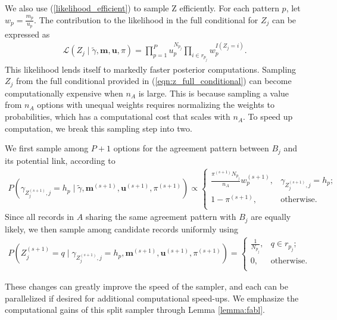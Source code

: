 \documentclass[ba]{imsart}
\begin{document}
We also use (\ref{likelihood_efficient}) to sample Z efficiently. For each pattern $p$, let $w_p =\frac{m_p}{u_p}$.  The contribution to the likelihood in the full conditional for $Z_j$ can be expressed as
\begin{align}
	\mathcal{L}(Z_j\mid  \tilde{\gamma}, \bm{m}, \bm{u}, \pi) = \prod_{p=1}^P u_p^{N_{p_j}} \prod_{i \in r_{p_j}} w_p^{I(Z_j = i)}. \label{likelihood_efficient_z}
\end{align}
This likelihood lends itself to markedly faster posterior computations. Sampling $Z_j$ from the full conditional provided in (\ref{eqn:z_full_conditional}) can become computationally expensive when $n_A$ is large. This is because sampling a value from $n_A$ options with unequal weights requires normalizing the weights to probabilities, which has a computational cost that scales with $n_A$. To speed up computation, we break this sampling step into two. 

We first sample among $P + 1$ options for the agreement pattern between $B_j$ and its potential link, according to
\begin{align}
	\label{eqn:gibbs1}
	P\left( \gamma_{Z_j^{(s+1)}, j} = h_p \mid \tilde{\gamma}, \bm{m}^{(s+1)}, \bm{u}^{(s+1)}, \pi^{(s+1)}\right) \propto
	\begin{cases} 
		\frac{\pi^{(s+1)}N_{p_j}}{n_A}  w_{p}^{(s+1)},  & \gamma_{Z_j^{(s+1)}, j} = h_p; \\
		1- \pi^{(s+1)} , &   \text{otherwise}. \\
	\end{cases}
\end{align}
Since all records in $A$ sharing the same agreement pattern with $B_j$ are equally likely, we then sample among candidate records uniformly using
\begin{align}
	\label{eqn:gibbs2}
	P\left(Z_j^{(s+1)} = q \mid \gamma_{Z_j^{(s+1)}, j} = h_p, \bm{m}^{(s+1)}, \bm{u}^{(s+1)}, \pi^{(s+1)} \right) = \begin{cases} 
		\frac{1}{N_{p_j}}, & q \in r_{p_j}; \\
		0, & \text{otherwise.} \\
	\end{cases}
\end{align} 

These changes can greatly improve the speed of the sampler, and each can be parallelized if desired for additional computational speed-ups. We emphasize the computational gains of this split sampler through Lemma \ref{lemma:fabl}.
\end{document}
